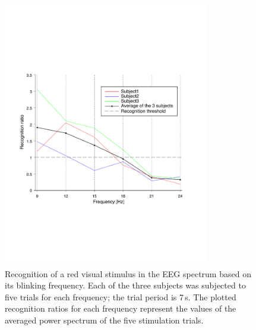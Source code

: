 \documentclass[smallextended]{svjour3}
\begin{document}
\begin{figure}
\center
\includegraphics[width=0.8\textwidth]{figures/graph-frequences.pdf}
\caption{Recognition of a red visual stimulus in the EEG spectrum based on its blinking frequency. Each of the three subjects was subjected to five trials for each frequency; the trial period is 7\,s. The plotted recognition ratios for each frequency represent the values of the averaged power spectrum of the five stimulation trials.} \label{fig:graph-frequences}
\end{figure}
\end{document}
